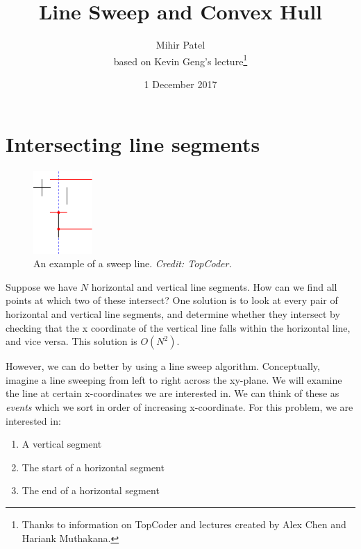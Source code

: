 \documentclass{article}
\title{Line Sweep and Convex Hull}
\author{Mihir Patel \\
    \normalsize based on Kevin Geng's lecture\footnote{Thanks to information on TopCoder and lectures created by Alex Chen and Hariank Muthakana.}}
\date{1 December 2017}
\begin{document}
\maketitle


\section{Intersecting line segments}


\begin{figure}
  \vspace{-30pt}
  \begin{center}
    \includegraphics[width=0.20\textwidth]{linesvh.png}
  \end{center}
  \vspace{-10pt}
  \caption{An example of a sweep line. \textit{Credit: TopCoder.}}
  \vspace{-20pt}
\end{figure}

Suppose we have $N$ horizontal and vertical line segments. How can we find all points at which two of these intersect? One solution is to look at every pair of horizontal and vertical line segments, and determine whether they intersect by checking that the x coordinate of the vertical line falls within the horizontal line, and vice versa. This solution is $O(N^2)$.

However, we can do better by using a line sweep algorithm. Conceptually, imagine a line sweeping from left to right across the xy-plane. We will examine the line at certain x-coordinates we are interested in. We can think of these as \textit{events} which we sort in order of increasing x-coordinate. For this problem, we are interested in:

\begin{enumerate}
    \itemsep 0em
    \item A vertical segment
    \item The start of a horizontal segment
    \item The end of a horizontal segment
\end{enumerate}
\end{document}
